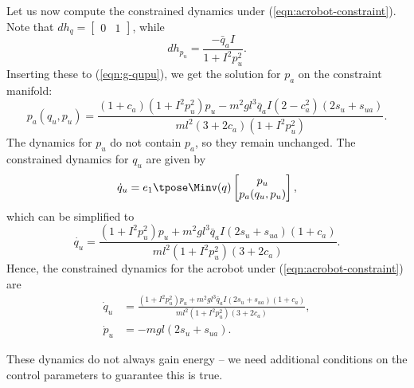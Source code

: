 Let us now compute the constrained dynamics under
(\ref{eqn:acrobot-constraint}).
Note that \(dh_q = \begin{bmatrix}0 & 1\end{bmatrix}\), while
\[
    dh_{p_u} = \frac{-\bar{q}_a I}{1 + I^2 p_u^2}
    .
\]
Inserting these to (\ref{eqn:g-qupu}), we get the solution for \(p_a\) on the
constraint manifold:
\[
    p_a(q_u,p_u) = \frac{
        (1+c_a)(1+I^2 p_u^2)p_u - m^2gl^3\bar{q}_a I (2-c_a^2)(2s_u + s_{ua})
    }{ml^2(3+2c_a)(1+I^2 p_u^2)}
    .
\]
The dynamics for \(p_u\) do not contain \(p_a\), so they remain unchanged.
The constrained dynamics for \(q_u\) are given by 
\begin{equation*}
    \dot{q}_u = e_1\tpose \Minv(q) \begin{bmatrix}
                    p_u \\ p_a(q_u,p_u)
                \end{bmatrix} %
    ,
\end{equation*}
which can be simplified to 
\begin{equation*}
    \dot{q_u} = \frac{(1+I^2 p_u^2)p_u + m^2gl^3\bar{q}_a I(2s_u + s_{ua})(1+c_a) }{ml^2(1+I^2 p_u^2)(3+2c_a)}
    .
\end{equation*}
Hence, the constrained dynamics for the acrobot under
(\ref{eqn:acrobot-constraint}) are
\begin{align}\label{eqn:acrobot-constrained-dynamics}
    \dot{q}_u &= \frac{(1+I^2 p_u^2)p_u + m^2gl^3\bar{q}_a I(2s_u + s_{ua})(1+c_a) }
            {ml^2(1+I^2 p_u^2)(3+2c_a)}
        , \\
    \dot{p}_u &= - m g l (2s_u + s_{ua})
    . \nonumber
\end{align}

These dynamics do not always gain energy -- we need additional conditions
on the control parameters to guarantee this is true.

